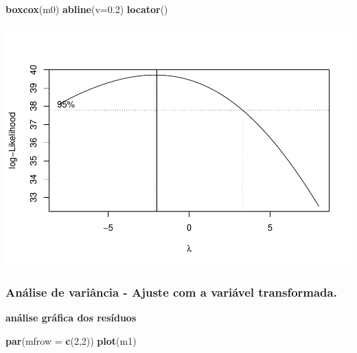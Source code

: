 \documentclass[
]{book}
\newenvironment{Shaded}{\begin{snugshade}}{\end{snugshade}}
\newcommand{\DataTypeTok}[1]{\textcolor[rgb]{0.13,0.29,0.53}{#1}}
\newcommand{\DecValTok}[1]{\textcolor[rgb]{0.00,0.00,0.81}{#1}}
\newcommand{\FloatTok}[1]{\textcolor[rgb]{0.00,0.00,0.81}{#1}}
\newcommand{\KeywordTok}[1]{\textcolor[rgb]{0.13,0.29,0.53}{\textbf{#1}}}
\newcommand{\NormalTok}[1]{#1}
\newcommand{\OperatorTok}[1]{\textcolor[rgb]{0.81,0.36,0.00}{\textbf{#1}}}
\newcommand{\StringTok}[1]{\textcolor[rgb]{0.31,0.60,0.02}{#1}}
\begin{document}
\begin{Shaded}
\begin{Highlighting}[]
  \KeywordTok{boxcox}\NormalTok{(m0)}
  \KeywordTok{abline}\NormalTok{(}\DataTypeTok{v=}\FloatTok{0.2}\NormalTok{)}
  \KeywordTok{locator}\NormalTok{()}
\end{Highlighting}
\end{Shaded}

\includegraphics{TudodoR_files/figure-latex/unnamed-chunk-292-1.pdf}

\hypertarget{anuxe1lise-de-variuxe2ncia---ajuste-com-a-variuxe1vel-transformada.}{%
\subsubsection{Análise de variância - Ajuste com a variável transformada.}\label{anuxe1lise-de-variuxe2ncia---ajuste-com-a-variuxe1vel-transformada.}}

\begin{Shaded}
\end{Shaded}

\textbf{análise gráfica dos resíduos}

\begin{Shaded}
\begin{Highlighting}[]
\KeywordTok{par}\NormalTok{(}\DataTypeTok{mfrow =} \KeywordTok{c}\NormalTok{(}\DecValTok{2}\NormalTok{,}\DecValTok{2}\NormalTok{))}
\KeywordTok{plot}\NormalTok{(m1)}
\end{Highlighting}
\end{Shaded}
\end{document}
